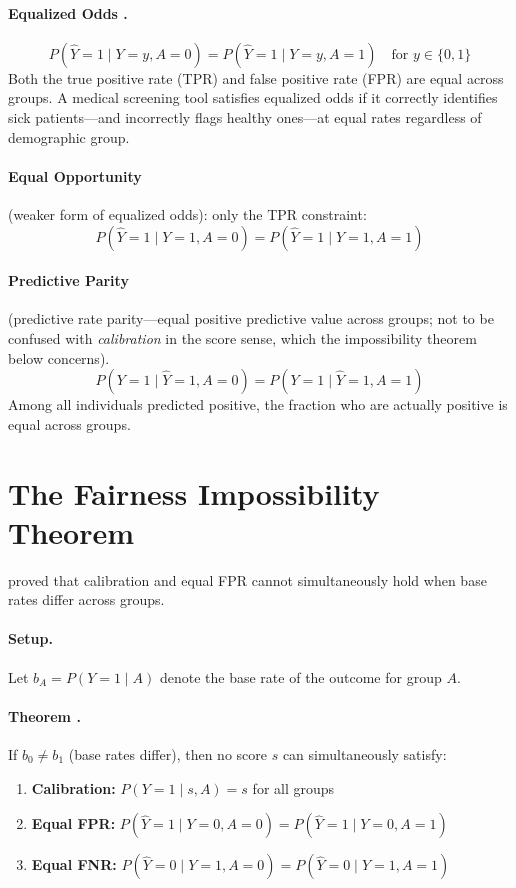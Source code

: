 \paragraph{Equalized Odds \autocite{hardt2016equality}.}
\[
P(\hat{Y} = 1 \mid Y = y, A = 0) = P(\hat{Y} = 1 \mid Y = y, A = 1) \quad \text{for } y \in \{0,1\}
\]
Both the true positive rate (TPR) and false positive rate (FPR) are equal across groups. A medical screening tool satisfies equalized odds if it correctly identifies sick patients---and incorrectly flags healthy ones---at equal rates regardless of demographic group.

\paragraph{Equal Opportunity} (weaker form of equalized odds): only the TPR constraint:
\[
P(\hat{Y} = 1 \mid Y = 1, A = 0) = P(\hat{Y} = 1 \mid Y = 1, A = 1)
\]

\paragraph{Predictive Parity} (predictive rate parity---equal positive predictive value across groups; not to be confused with \emph{calibration} in the score sense, which the impossibility theorem below concerns).
\[
P(Y = 1 \mid \hat{Y} = 1, A = 0) = P(Y = 1 \mid \hat{Y} = 1, A = 1)
\]
Among all individuals predicted positive, the fraction who are actually positive is equal across groups.

\section{The Fairness Impossibility Theorem}
\label{sec:a14-impossibility}

\textcite{chouldechova2017fair} proved that calibration and equal FPR cannot simultaneously hold when base rates differ across groups.

\paragraph{Setup.} Let $b_A = P(Y = 1 \mid A)$ denote the base rate of the outcome for group $A$.

\paragraph{Theorem \autocite{chouldechova2017fair}.} If $b_0 \neq b_1$ (base rates differ), then no score $s$ can simultaneously satisfy:
\begin{enumerate}
    \item \textbf{Calibration:} $P(Y=1 \mid s, A) = s$ for all groups
    \item \textbf{Equal FPR:} $P(\hat{Y}=1 \mid Y=0, A=0) = P(\hat{Y}=1 \mid Y=0, A=1)$
    \item \textbf{Equal FNR:} $P(\hat{Y}=0 \mid Y=1, A=0) = P(\hat{Y}=0 \mid Y=1, A=1)$
\end{enumerate}

